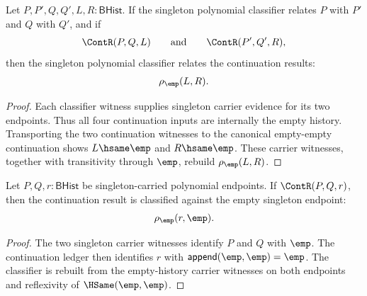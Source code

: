 \begin{theorem}
\label{thm:polynomial-singleton-classifier-continuation-closed}
Let $P,P',Q,Q',L,R:\mathsf{BHist}$. If the singleton polynomial classifier
relates $P$ with $P'$ and $Q$ with $Q'$, and if
$$
\ContR(P,Q,L)
\qquad\text{and}\qquad
\ContR(P',Q',R),
$$
then the singleton polynomial classifier relates the continuation results:
$$
\rho_{\emp}(L,R).
$$
\end{theorem}
\begin{proof}
Each classifier witness supplies singleton carrier evidence for its two
endpoints. Thus all four continuation inputs are internally the empty history.
Transporting the two continuation witnesses to the canonical empty-empty
continuation shows $L\hsame\emp$ and $R\hsame\emp$. These carrier witnesses,
together with transitivity through $\emp$, rebuild $\rho_{\emp}(L,R)$.
\end{proof}

\begin{theorem}
\label{thm:polynomial-singleton-cont-result-empty-classified}
Let $P,Q,r:\mathsf{BHist}$ be singleton-carried polynomial endpoints. If
$\ContR(P,Q,r)$, then the continuation result is classified against the empty
singleton endpoint:
$$
\rho_{\emp}(r,\emp).
$$
\end{theorem}
\begin{proof}
The two singleton carrier witnesses identify $P$ and $Q$ with $\emp$. The
continuation ledger then identifies $r$ with
$\mathsf{append}(\emp,\emp)=\emp$. The classifier is rebuilt from the
empty-history carrier witnesses on both endpoints and reflexivity of
$\HSame(\emp,\emp)$.
\end{proof}


